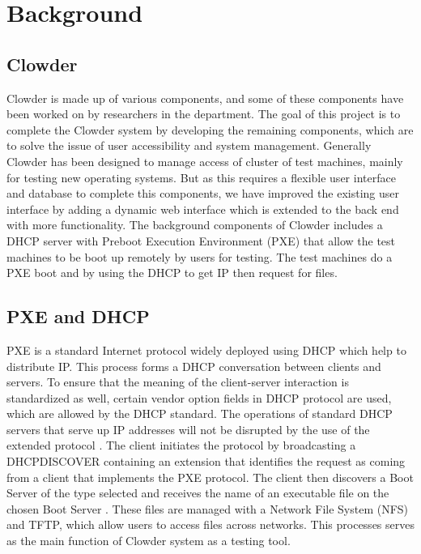 \chapter{Background}
\label{chap:figtab}
\label{chap}
\section{Clowder}
Clowder is made up of various components, and some of these components have been worked on by researchers in the department. The goal of this project is to complete the Clowder system by developing the remaining components, which are to solve the issue of user accessibility and system management. Generally Clowder has been designed to manage access of cluster of test machines, mainly for testing new operating systems. But as this requires a flexible user interface and database to complete this components, we have improved the existing user interface by adding a dynamic web interface which is extended to the back end with more functionality. The background components of Clowder includes  a  DHCP server with Preboot Execution Environment (PXE)  that allow the test machines to be boot up remotely by users for testing. The test machines do a PXE boot and by using the DHCP to get IP then request for files. 
\section{PXE and DHCP}
PXE is a standard Internet protocol widely deployed using DHCP which help to distribute IP. This process forms a DHCP conversation between clients and servers. To ensure that the meaning of the client-server interaction is standardized as well, certain vendor option fields in DHCP protocol are used, which are allowed by the DHCP standard. The operations of standard DHCP servers that serve up IP addresses will not be disrupted by the use of the extended protocol \cite{PXE}.
The client initiates the protocol by broadcasting a DHCPDISCOVER containing an extension that identifies the request as coming from a client that implements the PXE protocol. The client then discovers a Boot Server of the type selected and receives the name of an executable file on the chosen Boot Server \cite{PXE}. These files are managed with a Network File System (NFS) and TFTP, which allow users to access files across networks. This processes serves as the main function of Clowder system as a testing tool.
